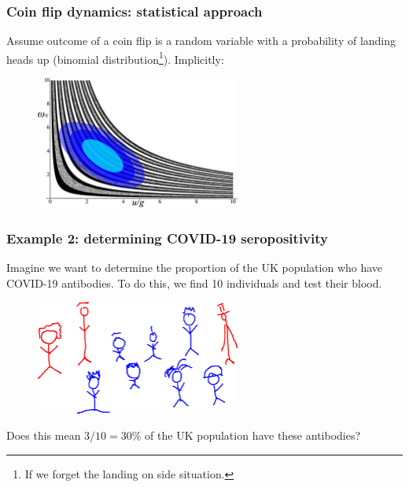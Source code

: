 \documentclass[handout]{beamer}
\begin{document}
\begin{frame}
	\frametitle{Coin flip dynamics: statistical approach}
	
	Assume outcome of a coin flip is a random variable with a probability of landing heads up (binomial distribution\footnote{If we forget the landing on side situation.}). Implicitly:
	
	\begin{figure}[ht]
		\centerline{\includegraphics[width=0.6\textwidth]{./figures/coin_toss_density.pdf}}
	\end{figure}
	
\end{frame}

\begin{frame}
	\frametitle{Example 2: determining COVID-19 seropositivity}
	Imagine we want to determine the proportion of the UK population who have COVID-19 antibodies. To do this, we find 10 individuals and test their blood.
	
	\begin{figure}[ht]
		\centerline{\includegraphics[width=0.6\textwidth]{./figures/covid_stick.pdf}}
	\end{figure}
	
	Does this mean $3/10=30\%$ of the UK population have these antibodies?
	
\end{frame}
\end{document}
